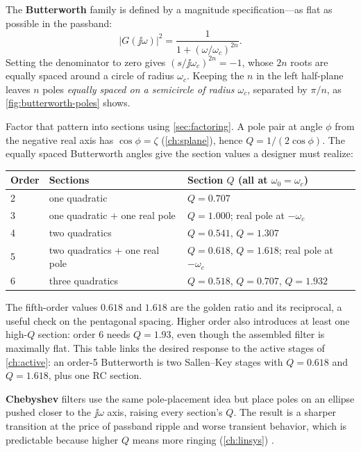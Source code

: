 The \textbf{Butterworth} family is defined by a magnitude specification---as flat as
possible in the passband:
\[
|G(\jj\omega)|^2=\frac{1}{1+(\omega/\omega_c)^{2n}} .
\]
Setting the denominator to zero gives
\((s/\jj\omega_c)^{2n}=-1\), whose \(2n\) roots are equally spaced around a circle of
radius \(\omega_c\). Keeping the \(n\) in the left half-plane leaves \(n\) poles
\emph{equally spaced on a semicircle of radius \(\omega_c\)}, separated by \(\pi/n\),
as \cref{fig:butterworth-poles} shows.

Factor that pattern into sections using \cref{sec:factoring}. A pole pair at angle
\(\phi\) from the negative real axis has \(\cos\phi=\zeta\)
(\cref{ch:splane}), hence \(Q=1/(2\cos\phi)\). The equally spaced Butterworth
angles give the section values a designer must realize:

\begin{center}
\begin{tabularx}{\textwidth}{@{}L{0.10\textwidth}L{0.30\textwidth}Y@{}}
\toprule
Order & Sections & Section \(Q\) (all at \(\omega_0=\omega_c\)) \\
 & one quadratic & \(Q=0.707\) \\
3 & one quadratic + one real pole & \(Q=1.000\); real pole at \(-\omega_c\) \\
4 & two quadratics & \(Q=0.541\), \(Q=1.307\) \\
5 & two quadratics + one real pole & \(Q=0.618\), \(Q=1.618\); real pole at \(-\omega_c\) \\
6 & three quadratics & \(Q=0.518\), \(Q=0.707\), \(Q=1.932\) \\
\bottomrule
\end{tabularx}
\end{center}

The fifth-order values \(0.618\) and \(1.618\) are the golden ratio and its
reciprocal, a useful check on the pentagonal spacing. Higher order also introduces
at least one high-\(Q\) section: order 6 needs \(Q=1.93\), even though the assembled
filter is maximally flat. This table links the desired response to the active stages
of \cref{ch:active}: an order-5 Butterworth is two Sallen--Key stages with
\(Q=0.618\) and \(Q=1.618\), plus one RC section.

\textbf{Chebyshev} filters use the same pole-placement idea but place poles on an
ellipse pushed closer to the \(\jj\omega\) axis, raising every section's \(Q\). The
result is a sharper transition at the price of passband ripple and worse transient
behavior, which is predictable because higher \(Q\) means more ringing
(\cref{ch:linsys}) \cite[pp.~209--220]{free2022rfmicrowave}.

